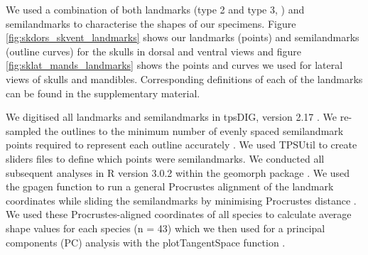 \documentclass[12pt,a4paper]{article}
\begin{document}
	We used a combination of both landmarks (type 2 and type 3, \citep{Zelditch2012}) and semilandmarks to characterise the shapes of our specimens. Figure \ref{fig:skdors_skvent_landmarks} shows our landmarks (points) and semilandmarks (outline curves) for the skulls in dorsal and ventral views and figure \ref{fig:sklat_mands_landmarks} shows the points and curves we used for lateral views of skulls and mandibles. Corresponding definitions of each of the landmarks can be found in the supplementary material.
	

	We digitised all landmarks and semilandmarks in tpsDIG, version 2.17 \citep{Rohlf2013}. We re-sampled the outlines to the minimum number of evenly spaced semilandmark points required to represent each outline accurately \citep[][details in supplementary material]{MacLeod2013}. We used TPSUtil \citep{Rohlf2012} to create sliders files \citep{Zelditch2012} to define which points were semilandmarks. We conducted all subsequent analyses in R version 3.0.2 \citep{Team2014} within the geomorph package \citep{Adams2013}. We used the gpagen function to run a general Procrustes alignment \citep{Rohlf1993} of the landmark coordinates while sliding the semilandmarks by minimising Procrustes distance \citep{Bookstein1997}. We used these Procrustes-aligned coordinates of all species to calculate average shape values for each species (n = 43) which we then used for a principal components (PC) analysis with the plotTangentSpace function \citep{Adams2013}. 
\end{document}
